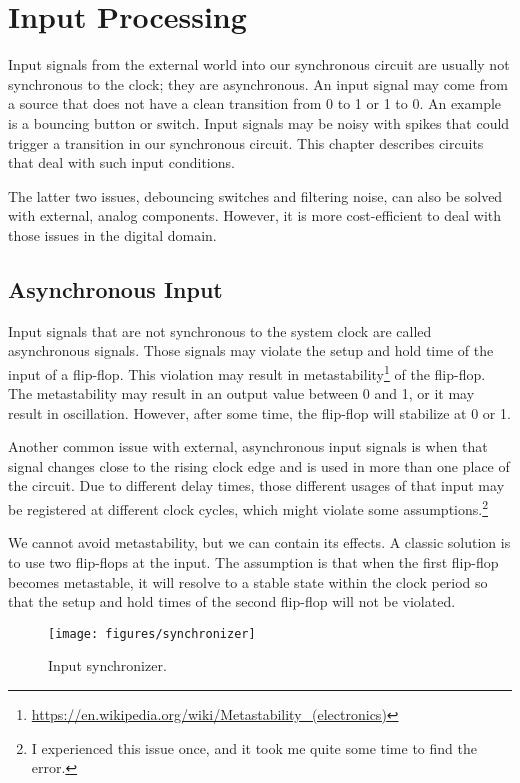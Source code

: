 \documentclass[%
    10pt,
    headinclude, footexclude,
    openright, %
    notitlepage,
    cleardoubleempty,
    headsepline,
    pointlessnumbers,
    bibtotoc, idxtotoc,
    ]{scrbook}
\newcommand{\scale}{0.7}
\newcommand{\myref}[2]{\href{#1}{#2}}
\renewcommand{\myref}[2]{{#2}{\footnote{\url{#1}}}}
\begin{document}
\chapter{Input Processing}
\label{sec:input}

Input signals from the external world into our synchronous circuit are usually
not synchronous to the clock; they are asynchronous.
An input signal may come from a source that does not have a clean transition from
0 to 1 or 1 to 0. An example is a bouncing button or switch.
Input signals may be noisy with spikes that could trigger a transition in our
synchronous circuit. This chapter describes circuits that deal with such input
conditions.

The latter two issues, debouncing switches and filtering noise, can also be
solved with external, analog components. However, it is more cost-efficient
to deal with those issues in the digital domain.

\section{Asynchronous Input}

Input signals that are not synchronous to the system clock are called
asynchronous signals. Those signals may violate the setup and hold time
of the input of a flip-flop. This violation may result in
\myref{https://en.wikipedia.org/wiki/Metastability_(electronics)}{metastability}
of the flip-flop. The metastability may result in an output value between 0 and
1, or it may result in oscillation. However, after some time, the flip-flop will
stabilize at 0 or 1.

Another common issue with external, asynchronous input signals is when
that signal changes close to the rising clock edge and is used in more than one
place of the circuit. Due to different delay times, those different usages of that
input may be registered at different clock cycles, which might violate
some assumptions.\footnote{I experienced this issue once, and it took me
quite some time to find the error.}

We cannot avoid metastability, but we can contain its effects.
A classic solution is to use two flip-flops at the input. The assumption is that
when the first flip-flop becomes metastable, it will resolve to a stable
state within the clock period so that the setup and hold times of the
second flip-flop will not be violated.

\begin{figure}
  \centering
  \texttt{[image: figures/synchronizer]}
  \caption{Input synchronizer.}
  \label{fig:synchronizer}
\end{figure}
\end{document}
